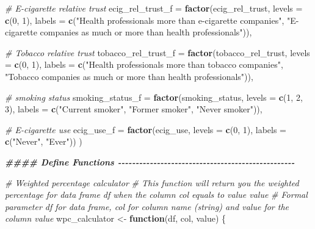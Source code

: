 \documentclass[
]{article}
\newenvironment{Shaded}{\begin{snugshade}}{\end{snugshade}}
\newcommand{\AttributeTok}[1]{\textcolor[rgb]{0.13,0.29,0.53}{#1}}
\newcommand{\CommentTok}[1]{\textcolor[rgb]{0.56,0.35,0.01}{\textit{#1}}}
\newcommand{\ControlFlowTok}[1]{\textcolor[rgb]{0.13,0.29,0.53}{\textbf{#1}}}
\newcommand{\DecValTok}[1]{\textcolor[rgb]{0.00,0.00,0.81}{#1}}
\newcommand{\DocumentationTok}[1]{\textcolor[rgb]{0.56,0.35,0.01}{\textbf{\textit{#1}}}}
\newcommand{\FunctionTok}[1]{\textcolor[rgb]{0.13,0.29,0.53}{\textbf{#1}}}
\newcommand{\NormalTok}[1]{#1}
\newcommand{\OtherTok}[1]{\textcolor[rgb]{0.56,0.35,0.01}{#1}}
\newcommand{\StringTok}[1]{\textcolor[rgb]{0.31,0.60,0.02}{#1}}
\begin{document}
\begin{Shaded}
\begin{Highlighting}[]
    \CommentTok{\# E{-}cigarette relative trust}
    \AttributeTok{ecig\_rel\_trust\_f =} \FunctionTok{factor}\NormalTok{(ecig\_rel\_trust,}
                              \AttributeTok{levels =} \FunctionTok{c}\NormalTok{(}\DecValTok{0}\NormalTok{, }\DecValTok{1}\NormalTok{),}
                              \AttributeTok{labels =} \FunctionTok{c}\NormalTok{(}\StringTok{"Health professionals more than e{-}cigarette companies"}\NormalTok{, }\StringTok{"E{-}cigarette companies as much or more than health professionals"}\NormalTok{)),}
    
    \CommentTok{\# Tobacco relative trust}
    \AttributeTok{tobacco\_rel\_trust\_f =} \FunctionTok{factor}\NormalTok{(tobacco\_rel\_trust,}
                                 \AttributeTok{levels =} \FunctionTok{c}\NormalTok{(}\DecValTok{0}\NormalTok{, }\DecValTok{1}\NormalTok{),}
                                 \AttributeTok{labels =} \FunctionTok{c}\NormalTok{(}\StringTok{"Health professionals more than tobacco companies"}\NormalTok{, }\StringTok{"Tobacco companies as much or more than health professionals"}\NormalTok{)),}
    
    \CommentTok{\# smoking status}
    \AttributeTok{smoking\_status\_f =} \FunctionTok{factor}\NormalTok{(smoking\_status,}
                             \AttributeTok{levels =} \FunctionTok{c}\NormalTok{(}\DecValTok{1}\NormalTok{, }\DecValTok{2}\NormalTok{, }\DecValTok{3}\NormalTok{),}
                             \AttributeTok{labels =} \FunctionTok{c}\NormalTok{(}\StringTok{"Current smoker"}\NormalTok{, }\StringTok{"Former smoker"}\NormalTok{, }\StringTok{"Never smoker"}\NormalTok{)),}
    
    \CommentTok{\# E{-}cigarette use}
    \AttributeTok{ecig\_use\_f =} \FunctionTok{factor}\NormalTok{(ecig\_use,}
                        \AttributeTok{levels =} \FunctionTok{c}\NormalTok{(}\DecValTok{0}\NormalTok{, }\DecValTok{1}\NormalTok{),}
                        \AttributeTok{labels =} \FunctionTok{c}\NormalTok{(}\StringTok{"Never"}\NormalTok{, }\StringTok{"Ever"}\NormalTok{))}
\NormalTok{  )}

\DocumentationTok{\#\#\#\# Define Functions {-}{-}{-}{-}{-}{-}{-}{-}{-}{-}{-}{-}{-}{-}{-}{-}{-}{-}{-}{-}{-}{-}{-}{-}{-}{-}{-}{-}{-}{-}{-}{-}{-}{-}{-}{-}{-}{-}{-}{-}{-}{-}{-}{-}{-}{-}{-}{-}{-}{-}}


\CommentTok{\# Weighted percentage calculator}
\CommentTok{\# This function will return you the weighted percentage for data frame \textquotesingle{}df\textquotesingle{} when the column \textquotesingle{}col\textquotesingle{} equals to value \textquotesingle{}value\textquotesingle{}}
\CommentTok{\# Formal parameter \textquotesingle{}df\textquotesingle{} for data frame, \textquotesingle{}col\textquotesingle{} for column name (string) and \textquotesingle{}value\textquotesingle{} for the column value}
\NormalTok{wpc\_calculator }\OtherTok{\textless{}{-}} \ControlFlowTok{function}\NormalTok{(df, col, value) \{}
  

\end{Highlighting}
\end{Shaded}
\end{document}
